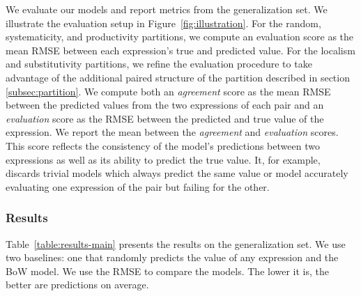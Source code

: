 We evaluate our models and report metrics from the generalization set. We illustrate the evaluation setup in Figure~\ref{fig:illustration}. For the random, systematicity, and productivity partitions, we compute an evaluation score as the mean RMSE between each expression's true and predicted value. For the localism and substitutivity partitions, we refine the evaluation procedure to take advantage of the additional paired structure of the partition described in section \ref{subsec:partition}. We compute both an \textit{agreement} score as the mean RMSE between the predicted values from the two expressions of each pair and an \textit{evaluation} score as the RMSE between the predicted and true value of the expression. We report the mean between the \textit{agreement} and \textit{evaluation} scores. This score reflects the consistency of the model's predictions between two expressions as well as its ability to predict the true value. It, for example, discards trivial models which always predict the same value or model accurately evaluating one expression of the pair but failing for the other.


\subsubsection{Results}
\label{sec:results}


Table~\ref{table:results-main} presents the results on the generalization set. We use two baselines: one that randomly predicts the value of any expression and the BoW model. We use the RMSE to compare the models. The lower it is, the better are predictions on average.

